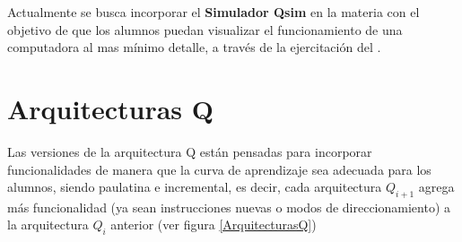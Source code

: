 Actualmente se busca incorporar el \textbf{Simulador Qsim} en la materia con el objetivo de que los alumnos puedan visualizar el funcionamiento de una computadora al mas mínimo detalle, a través de la ejercitación del \ciclo.

\section{Arquitecturas Q}

Las versiones de la arquitectura Q están pensadas para incorporar funcionalidades de manera que la curva de aprendizaje sea adecuada para los alumnos, siendo paulatina e incremental, es decir, cada arquitectura $Q_{i+1}$ agrega más funcionalidad (ya sean instrucciones nuevas o modos de direccionamiento) a la arquitectura  $Q_{i}$ anterior (ver figura \ref{ArquitecturasQ})





